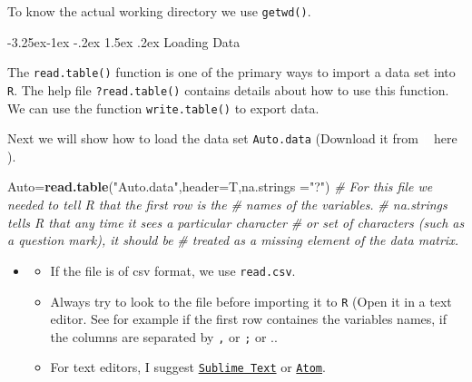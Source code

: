 \documentclass[]{book}
\makeatletter
\newenvironment{Shaded}{\begin{snugshade}}{\end{snugshade}}
\newcommand{\KeywordTok}[1]{\textcolor[rgb]{0.13,0.29,0.53}{\textbf{#1}}}
\newcommand{\DataTypeTok}[1]{\textcolor[rgb]{0.13,0.29,0.53}{#1}}
\newcommand{\StringTok}[1]{\textcolor[rgb]{0.31,0.60,0.02}{#1}}
\newcommand{\CommentTok}[1]{\textcolor[rgb]{0.56,0.35,0.01}{\textit{#1}}}
\newcommand{\NormalTok}[1]{#1}
\providecommand{\tightlist}{%
  \setlength{\itemsep}{0pt}\setlength{\parskip}{0pt}}
\newenvironment{rmdblock}[1]
  {\begin{shaded*}
  \begin{itemize}
  \renewcommand{\labelitemi}{
    \raisebox{-.7\height}[0pt][0pt]{
      {\setkeys{Gin}{width=2em,keepaspectratio}\texttt{[image: img/icons/\#1]}}
    }
  }
  \item
  }
  {
  \end{itemize}
  \end{shaded*}
  }
\newenvironment{rmdinsight}
  {\begin{rmdblock}{insight}}
  {\end{rmdblock}}
\renewcommand\subsection{\@startsection{subsection}{2}{\z@}%
                                     {-3.25ex\@plus -1ex \@minus -.2ex}%
                                     {1.5ex \@plus .2ex}%
                                     {\normalfont\large\bfseries\color{Violet}}}
\theoremstyle{definition}
\theoremstyle{definition}
\theoremstyle{definition}
\theoremstyle{remark}
\makeatother
\begin{document}
To know the actual working directory we use \texttt{getwd()}.

\subsection{Loading Data}\label{loading-data}

The \texttt{read.table()} function is one of the primary ways to import
a data set into \texttt{R}. The help file \texttt{?read.table()}
contains details about how to use this function. We can use the function
\texttt{write.table()} to export data.

Next we will show how to load the data set \texttt{Auto.data} (Download
it from \textcolor{white}{[}\faTable\textcolor{white}{]} here ).

\begin{Shaded}
\begin{Highlighting}[]
\NormalTok{Auto=}\KeywordTok{read.table}\NormalTok{(}\StringTok{"Auto.data"}\NormalTok{,}\DataTypeTok{header=}\NormalTok{T,}\DataTypeTok{na.strings =}\StringTok{"?"}\NormalTok{)}
\CommentTok{# For this file we needed to tell R that the first row is the}
\CommentTok{# names of the variables.}
\CommentTok{# na.strings tells R that any time it sees a particular character}
\CommentTok{# or set of characters (such as a question mark), it should be}
\CommentTok{# treated as a missing element of the data matrix. }
\end{Highlighting}
\end{Shaded}

\begin{rmdinsight}
\begin{itemize}
\tightlist
\item
  If the file is of csv format, we use \texttt{read.csv}.
\item
  Always try to look to the file before importing it to \texttt{R} (Open
  it in a text editor. See for example if the first row containes the
  variables names, if the columns are separated by \texttt{,} or
  \texttt{;} or ..
\item
  For text editors, I suggest
  \href{https://www.sublimetext.com/}{\texttt{Sublime\ Text}} or
  \href{https://atom.io/}{\texttt{Atom}}.
\end{itemize}
\end{rmdinsight}
\end{document}
